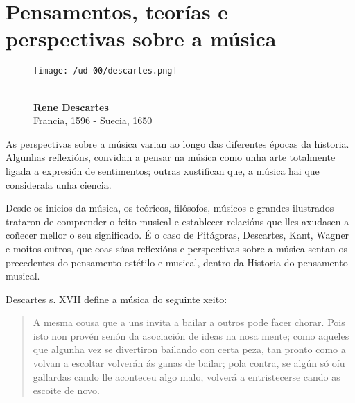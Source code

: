 % 
%

\section{Pensamentos, teorías e perspectivas sobre a música}

\begin{ejercicio}

\begin{wrapfigure}{l}{0.30\textwidth} 
\begin{center} 
\texttt{[image: /ud-00/descartes.png]} 
\end{center} 
\caption{\\ \textbf{Rene Descartes} \\ 
Francia, 1596 - Suecia, 1650} 
\label{fig:descartes}
\end{wrapfigure}

As perspectivas sobre a música varian ao longo das diferentes épocas da historia. 
Algunhas reflexións, convidan a pensar na música como unha arte totalmente ligada a expresión de sentimentos; outras xustifican que, a música hai que considerala unha ciencia.

Desde os inicios da música, os teóricos, filósofos, músicos e grandes ilustrados trataron de comprender o feito musical e establecer relacións que lles axudasen a coñecer mellor o seu significado. É o caso de Pitágoras, Descartes, Kant, Wagner e moitos outros, que coas súas reflexións e perspectivas sobre a música sentan os precedentes do pensamento estétilo e musical, dentro da Historia do pensamento musical. 

Descartes s. {\scriptsize  XVII} define a música do seguinte xeito:

    \begin{quotation}{\small
     \noindent
     A mesma cousa que a uns invita a bailar a outros pode facer chorar. Pois isto non provén senón da asociación de ideas na nosa mente; como aqueles que algunha vez se divertiron bailando con certa peza, tan pronto como a volvan a escoltar volverán ás ganas de bailar; pola contra, se algún só oíu gallardas cando lle aconteceu algo malo, volverá  a entristecerse cando as escoite de novo.}
    \end{quotation}
 

\end{ejercicio}
